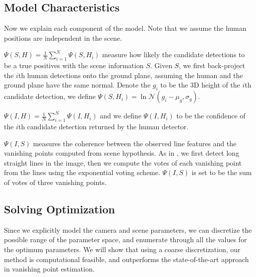 \subsection{Model Characteristics}
\label{sec:3-2}
Now we explain each component of the model. Note that we assume the human positions are independent in the scene.

$\Psi(S,H) = \frac{1}{N}\sum_{i=1}^N\Psi(S,H_i)$ measure how likely the candidate detections to be a true positives with the scene information $S$. Given $S$, we first back-project the $i$th human detections onto the ground plane, assuming the human and the ground plane have the same normal. Denote the $g_i$ to be the 3D height of the $i$th candidate detection, we define $\Psi(S,H_i) = \ln\mathcal{N}(g_i-\mu_g,\sigma_g)$.

$\Psi(I,H) = \frac{1}{N}\sum_{i=1}^N\Psi(I,H_i)$ and we define $\Psi(I,H_i)$ to be the confidence of the $i$th candidate detection returned by the human detector.

$\Psi(I,S)$ measures the coherence between the observed line features and the vanishing points computed from scene hypothesis. As in \cite{Hedau_ICCV2009}, we first detect long straight lines in the image, then we compute the votes of each vanishing point from the lines using the exponential voting scheme. $\Psi(I,S)$ is set to be the sum of votes of three vanishing points.

\subsection{Solving Optimization}
\label{sec:3-3}
Since we explicitly model the camera and scene parameters, we can discretize the possible range of the parameter space, and enumerate through all the values for the optimum parameters. We will show that using a coarse discretization, our method is computational feasible, and outperforms the state-of-the-art approach in vanishing point estimation.
